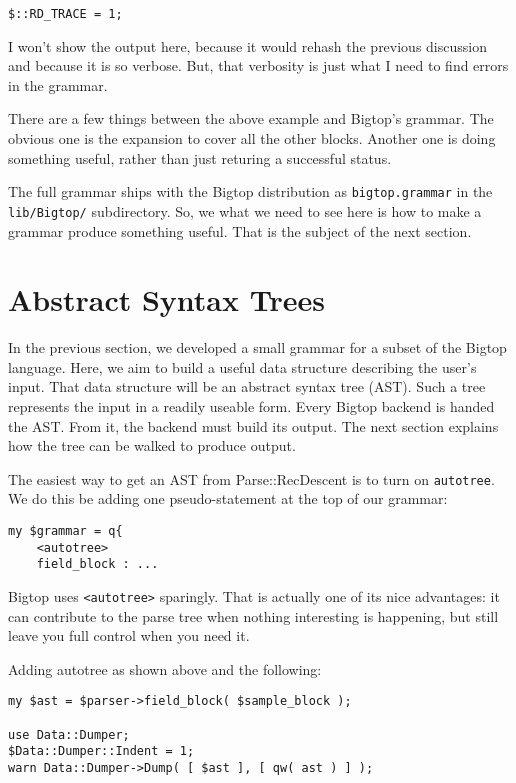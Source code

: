 \begin{verbatim}
$::RD_TRACE = 1;
\end{verbatim}

I won't show the output here, because it would rehash the previous discussion
and because it is so verbose.  But, that verbosity is just what I need
to find errors in the grammar.

There are a few things between the above example and Bigtop's grammar.
The obvious one is the expansion to cover all the other blocks.  Another
one is doing something useful, rather than just returing a successful
status.

The full grammar ships with the Bigtop distribution as \verb+bigtop.grammar+
in the \verb+lib/Bigtop/+ subdirectory.  So, we what we need to see here is
how to make a grammar produce something useful.  That is the subject of the
next section.

\section{Abstract Syntax Trees}

In the previous section, we developed a small grammar for a subset
of the Bigtop language.  Here, we aim to build a useful data structure
describing the user's input.  That data structure will be an abstract
syntax tree (AST).  Such a tree represents the input in a readily useable
form.  Every Bigtop backend is handed the AST.  From it, the backend must
build its output.  The next section explains how the tree can be walked
to produce output.

The easiest way to get an AST from Parse::RecDescent is to turn on
\verb+autotree+.  We do this be adding one pseudo-statement at the top of
our grammar:

\begin{verbatim}
my $grammar = q{
    <autotree>
    field_block : ...
\end{verbatim}

Bigtop uses \verb+<autotree>+ sparingly.  That is actually one of its nice
advantages: it can contribute to the parse tree when nothing interesting
is happening, but still leave you full control when you need it.

Adding autotree as shown above and the following:

\begin{verbatim}
my $ast = $parser->field_block( $sample_block );

use Data::Dumper;
$Data::Dumper::Indent = 1;
warn Data::Dumper->Dump( [ $ast ], [ qw( ast ) ] );
\end{verbatim}

